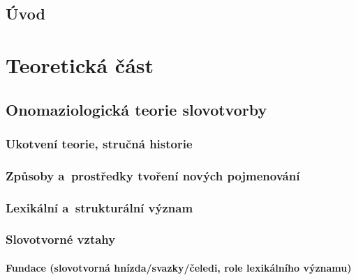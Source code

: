 \hypertarget{uxfavod}{%
\chapter*{Úvod}\label{uvod}
}

\part{Teoretická část}

\hypertarget{onomaziologickuxe1-teorie-slovotvorby}{%
\chapter{Onomaziologická teorie
slovotvorby}\label{onomaziologickuxe1-teorie-slovotvorby}}

\hypertarget{ukotvenuxed-teorie-struux10dnuxe1-historie}{%
\section{Ukotvení teorie, stručná
historie}\label{ukotvenuxed-teorie-struux10dnuxe1-historie}}

\hypertarget{zpux16fsoby-a-prostux159edky-tvoux159enuxed-novuxfdch-pojmenovuxe1nuxed}{%
\section{Způsoby a~prostředky tvoření nových
pojmenování}\label{zpux16fsoby-a-prostux159edky-tvoux159enuxed-novuxfdch-pojmenovuxe1nuxed}}

\hypertarget{lexikuxe1lnuxed-a-strukturuxe1lnuxed-vuxfdznam}{%
\section{Lexikální a~strukturální
význam}\label{lexikuxe1lnuxed-a-strukturuxe1lnuxed-vuxfdznam}}

\hypertarget{slovotvornuxe9-vztahy}{%
\section{Slovotvorné vztahy}\label{slovotvornuxe9-vztahy}}

\hypertarget{fundace-slovotvornuxe1-hnuxedzdasvazkyux10deledi-role-lexikuxe1lnuxedho-vuxfdznamu}{%
\subsection{Fundace (slovotvorná hnízda/svazky/čeledi, role
lexikálního
významu)}\label{fundace-slovotvornuxe1-hnuxedzdasvazkyux10deledi-role-lexikuxe1lnuxedho-vuxfdznamu}}

